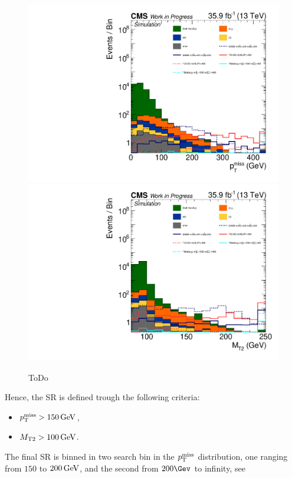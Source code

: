 \begin{figure}[htb]
 \centering
 \includegraphics[width=\pairwidth]{figures/mt2/onZ_LL_met_log}
 \includegraphics[width=\pairwidth]{figures/mt2/onZ_LL_mt2_log}
 \caption{ToDo}
 \label{fig:SRvariables}
\end{figure}
Hence, the SR is defined trough the following criteria:
\begin{itemize}
 \item $p_{\mathrm{T}}^\text{miss}>150\,\text{Ge\hspace{-.08em}V}$,
 \item $M_{\mathrm{T2}}>100\,\text{Ge\hspace{-.08em}V}$.
       
\end{itemize}
The final SR is binned in two search bin in the $p_{\mathrm{T}}^\text{miss}$ distribution, one ranging from $150$ to $200\,\text{Ge\hspace{-.08em}V}$, and the second from $200\Gev$ to infinity, see 


